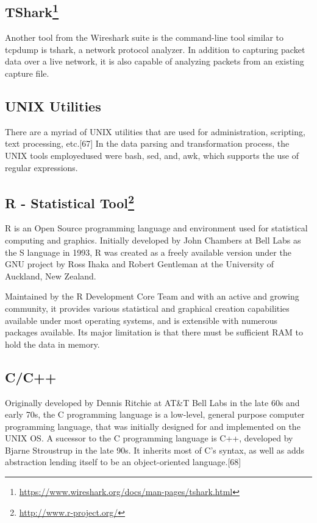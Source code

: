 \documentclass[12pt,]{article}
\let\rmarkdownfootnote\footnote%
\def\footnote{\protect\rmarkdownfootnote}
\begin{document}
\subsection[TShark]{TShark\footnote{\url{https://www.wireshark.org/docs/man-pages/tshark.html}}}\label{tshark3}

Another tool from the Wireshark suite is the command-line tool similar
to tcpdump is tshark, a network protocol analyzer. In addition to
capturing packet data over a live network, it is also capable of
analyzing packets from an existing capture file.

\subsection{UNIX Utilities}\label{unix-utilities}

There are a myriad of UNIX utilities that are used for administration,
scripting, text processing, etc.{[}67{]} In the data parsing and
transformation process, the UNIX tools employedused were bash, sed, and,
awk, which supports the use of regular expressions.

\subsection[R - Statistical Tool]{R - Statistical Tool\footnote{\url{http://www.r-project.org/}}}\label{r---statistical-tool4}

R is an Open Source programming language and environment used for
statistical computing and graphics. Initially developed by John Chambers
at Bell Labs as the S language in 1993, R was created as a freely
available version under the GNU project by Ross Ihaka and Robert
Gentleman at the University of Auckland, New Zealand.

Maintained by the R Development Core Team and with an active and growing
community, it provides various statistical and graphical creation
capabilities available under most operating systems, and is extensible
with numerous packages available. Its major limitation is that there
must be sufficient RAM to hold the data in memory.

\subsection{C/C++}\label{cc}

Originally developed by Dennis Ritchie at AT\&T Bell Labs in the late
60s and early 70s, the C programming language is a low-level, general
purpose computer programming language, that was initially designed for
and implemented on the UNIX OS. A sucessor to the C programming language
is C++, developed by Bjarne Stroustrup in the late 90s. It inherits most
of C's syntax, as well as adds abstraction lending itself to be an
object-oriented language.{[}68{]}
\end{document}
